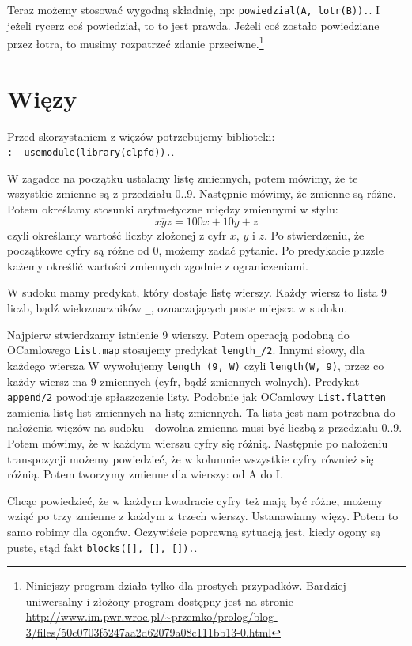\documentclass[12pt,a4paper]{article}
\begin{document}
Teraz możemy stosować wygodną składnię, np: \verb+powiedzial(A, lotr(B)).+. I jeżeli rycerz coś powiedział, to to jest prawda. Jeżeli coś zostało powiedziane przez łotra, to musimy rozpatrzeć zdanie przeciwne.\footnote{Niniejszy program działa tylko dla prostych przypadków. Bardziej uniwersalny i złożony program dostępny jest na stronie \url{http://www.im.pwr.wroc.pl/~przemko/prolog/blog-3/files/50c0703f5247aa2d62079a08c111bb13-0.html}}

\section{Więzy}
Przed skorzystaniem z więzów potrzebujemy biblioteki:\\\verb+:- usemodule(library(clpfd)).+.

W zagadce na początku ustalamy listę zmiennych, potem mówimy, że te wszystkie zmienne są z przedziału 0..9. Następnie mówimy, że zmienne są różne. Potem określamy stosunki arytmetyczne między zmiennymi w stylu:
\begin{equation}
\overline{xyz} = 100x+10y+z
\end{equation}
czyli określamy wartość liczby złożonej z cyfr $x$, $y$ i $z$. Po stwierdzeniu, że początkowe cyfry są różne od 0, możemy zadać pytanie. Po predykacie puzzle każemy określić wartości zmiennych zgodnie z ograniczeniami.

W sudoku mamy predykat, który dostaje listę wierszy. Każdy wiersz to lista 9 liczb, bądź wieloznaczników \verb+_+, oznaczających puste miejsca w sudoku.

Najpierw stwierdzamy istnienie 9 wierszy. Potem operacją podobną do OCamlowego \verb+List.map+ stosujemy predykat \verb+length_/2+. Innymi słowy, dla każdego wiersza W wywołujemy \verb+length_(9, W)+ czyli \verb+length(W, 9)+, przez co każdy wiersz ma 9 zmiennych (cyfr, bądź zmiennych wolnych). Predykat \verb+append/2+ powoduje spłaszczenie listy. Podobnie jak OCamlowy \verb+List.flatten+ zamienia listę list zmiennych na listę zmiennych. Ta lista jest nam potrzebna do nałożenia więzów na sudoku - dowolna zmienna musi być liczbą z przedziału 0..9. Potem mówimy, że w każdym wierszu cyfry się różnią. Następnie po nałożeniu transpozycji możemy powiedzieć, że w kolumnie wszystkie cyfry również się różnią. Potem tworzymy zmienne dla wierszy: od A do I.

Chcąc powiedzieć, że w każdym kwadracie cyfry też mają być różne, możemy wziąć po trzy zmienne z każdym z trzech wierszy. Ustanawiamy więzy. Potem to samo robimy dla ogonów. Oczywiście poprawną sytuacją jest, kiedy ogony są puste, stąd fakt \verb+blocks([], [], []).+.
\end{document}
